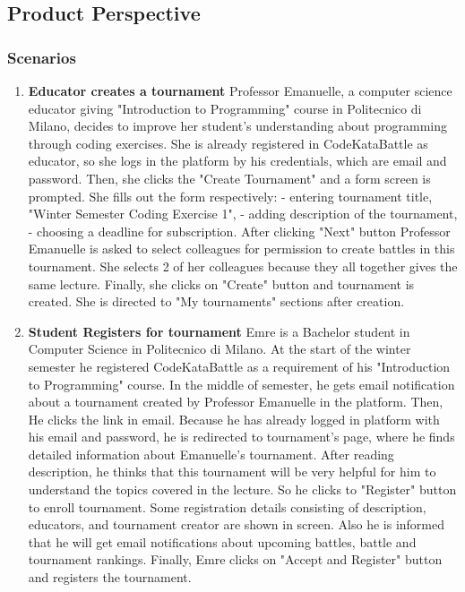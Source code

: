 \subsection{Product Perspective}
\subsubsection{Scenarios}
\begin{enumerate}
    \item \textbf{Educator creates a tournament} \newline Professor Emanuelle, a computer science educator giving "Introduction to Programming" course in Politecnico di Milano, decides to improve her student's understanding about programming through coding exercises. She is already registered in CodeKataBattle as educator, so she logs in the platform by his credentials, which are email and password. Then, she clicks the "Create Tournament" and a form screen is prompted. She fills out the form respectively: \newline
    - entering tournament title, "Winter Semester Coding Exercise 1", \newline
    - adding description of the tournament, \newline
    - choosing a deadline for subscription. After clicking "Next" button\newline
    Professor Emanuelle is asked to select colleagues for permission to create battles in this tournament. She selects 2 of her colleagues because they all together gives the same lecture. Finally, she clicks on "Create" button and tournament is created. She is directed to "My tournaments" sections after creation.
    \item \textbf{Student Registers for tournament} \newline Emre is a Bachelor student in Computer Science in Politecnico di Milano. At the start of the winter semester he registered CodeKataBattle as a requirement of his "Introduction to Programming" course. In the middle of semester, he gets email notification about a tournament created by Professor Emanuelle in the platform. Then, He clicks the link in email. Because he has already logged in platform with his email and password, he is redirected to tournament's page, where he finds detailed information about Emanuelle's tournament. After reading description, he thinks that this tournament will be very helpful for him to understand the topics covered in the lecture. So he clicks to "Register" button to enroll tournament. Some registration details consisting of description, educators, and tournament creator are shown in screen. Also he is informed that he will get email notifications about upcoming battles, battle and tournament rankings. Finally, Emre clicks on "Accept and Register" button and registers the tournament.

\end{enumerate}
